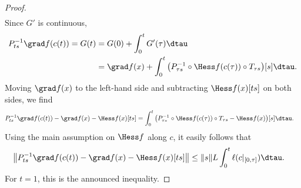 \begin{proof}
\begin{align}
	\end{align}
	Since $G'$ is continuous,
	\begin{align*}
		P_{ts}^{-1}\grad f(c(t)) = G(t) & = G(0) + \int_{0}^{t} G'(\tau) \dtau \\
										& = \grad f(x) + \int_{0}^{t} \left(P_{\tau s}^{-1} \circ \Hess f(c(\tau)) \circ T_{\tau s}\right)\![s]  \dtau.
	\end{align*}
	Moving $\grad f(x)$ to the left-hand side and subtracting $\Hess f(x)[ts]$ on both sides, we find
	\begin{align*}
		P_{ts}^{-1}\grad f(c(t)) - \grad f(x) - \Hess f(x)[ts] & = \int_{0}^{t} \left(P_{\tau s}^{-1} \circ \Hess f(c(\tau)) \circ T_{\tau s} - \Hess f(x)\right)\![s]  \dtau.
	\end{align*}
	Using the main assumption on $\Hess f$ along $c$, it easily follows that
	\begin{align}
		\left\| P_{ts}^{-1}\grad f(c(t)) - \grad f(x) - \Hess f(x)[ts] \right\| & \leq \|s\| L \int_{0}^{t} \ell(c|_{[0, \tau]}) \dtau.
		\label{eq:step2normboundLipschitzHessiangeneral}
	\end{align}
	For $t = 1$, this is the announced inequality.
\end{proof}

